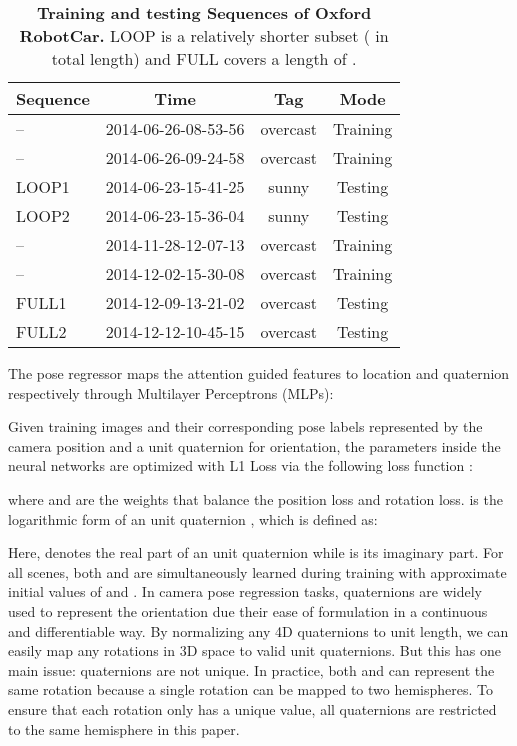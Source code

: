 \documentclass[letterpaper]{article}
\begin{document}
\begin{table}[t]
	\centering
	\caption{\textbf{Training and testing Sequences of Oxford RobotCar.} LOOP is a relatively shorter subset ( in total length) and FULL covers a length of . }
			\begin{tabular}{l|ccc}
				Sequence & Time & Tag &  Mode \\
				\hline
				\hline
				--    & 2014-06-26-08-53-56 & overcast & Training \\
				--    & 2014-06-26-09-24-58 & overcast & Training \\
				LOOP1 & 2014-06-23-15-41-25 & sunny    & Testing  \\
				LOOP2 & 2014-06-23-15-36-04 & sunny    & Testing  \\
				\hline
				--    & 2014-11-28-12-07-13 & overcast & Training \\
				--    & 2014-12-02-15-30-08 & overcast & Training \\
				FULL1 & 2014-12-09-13-21-02 & overcast & Testing  \\
				FULL2 & 2014-12-12-10-45-15 & overcast & Testing  \\
			\end{tabular}
    \vspace{-0.5cm}
	\label{tab:train_test_split}
\end{table}

The pose regressor maps the attention guided features  to location  and quaternion  respectively through Multilayer Perceptrons (MLPs): 
    
Given training images  and their corresponding pose labels  represented by the camera position  and a unit quaternion  for orientation, the parameters inside the neural networks are optimized with L1 Loss via the following loss function \cite{brahmbhatt2018geometry}:

where  and  are the weights that balance the position loss and rotation loss.
 is the logarithmic form of an unit quaternion , which is defined as:

Here,  denotes the real part of an unit quaternion while  is its imaginary part. For all scenes, both  and  are simultaneously learned during training with approximate initial values of  and . In camera pose regression tasks, quaternions are widely used to represent the orientation due their ease  of formulation in a continuous and differentiable way. By normalizing any 4D quaternions to unit length, we can easily map any rotations in 3D space to valid unit quaternions. But this has one main issue: quaternions are not unique. In practice, both  and  can represent the same rotation because a single rotation can be mapped to two hemispheres. To ensure that each rotation only has a unique value, all quaternions are restricted to the same hemisphere in this paper.
\end{document}
